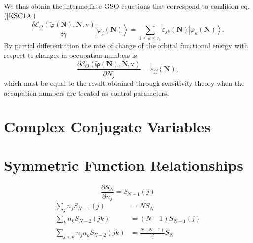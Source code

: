 \documentclass[aps,preprint]{revtex4}%
\begin{document}
We thus obtain the intermediate GSO equations that correspond to condition eq.
$\left(  \ref{KSC1A}\right)  $
\begin{equation}
\frac{\delta\mathcal{E}_{O}\left(  \mathbf{\tilde{\varphi}}\left(
\mathbf{N}\right)  ,\mathbf{N,}\mathrm{v}\right)  }{\delta\gamma}\left\vert
\tilde{\varphi}_{j}\left(  \mathbf{N}\right)  \right\rangle =\sum_{1\leq k\leq
r_{1}}\tilde{\varepsilon}_{jk}\left(  \mathbf{N}\right)  \left\vert
\tilde{\varphi}_{k}\left(  \mathbf{N}\right)  \right\rangle .
\end{equation}
By partial differentiation the rate of change of the orbital functional energy
with respect to changes in occupation numbers is
\begin{equation}
\frac{\partial\mathcal{E}_{O}\left(  \mathbf{\tilde{\varphi}}\left(
\mathbf{N}\right)  ,\mathbf{N,}\mathrm{v}\right)  }{\partial N_{j}}%
=\tilde{\varepsilon}_{jj}\left(  \mathbf{N}\right)  ,
\end{equation}
which must be equal to the result obtained through sensitivity theory when the
occupation numbers are treated as control parameters.

\section{Complex Conjugate Variables \label{ComplexConjugate}}

\section{Symmetric Function Relationships}%

\begin{equation}
\frac{\partial S_{N}}{\partial n_{j}}=S_{N-1}\left(  j\right)
\end{equation}%
\begin{align}
\sum_{j}n_{j}S_{N-1}\left(  j\right)   &  =NS_{N}\\
\sum_{k}n_{k}S_{N-2}\left(  jk\right)   &  =\left(  N-1\right)  S_{N-1}\left(
j\right) \\
\sum_{j<k}n_{j}n_{k}S_{N-2}\left(  jk\right)   &  =\frac{N\left(  N-1\right)
}{2}S_{N}%
\end{align}
\end{document}

